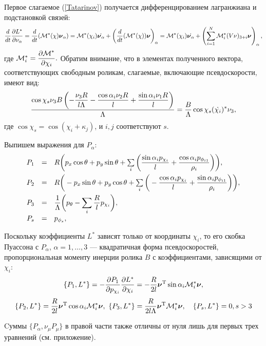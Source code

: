 Первое слагаемое (\ref{Tatarinov}) получается дифференцированием лагранжиана и подстановкой связей:
\begin{equation}
    \frac{d}{dt}\frac{\partial L^{*}}{\partial \nu_\alpha} = \frac{d}{dt}(\mathcal{M}^*(\chi)\boldsymbol{\mathbf{\nu}}_\alpha) = 
    \mathcal{M}^*(\chi_i)\dot{\boldsymbol{\mathbf{\nu}}_\alpha} +
    \left(\frac{d}{dt}(\mathcal{M}^*(\chi))\boldsymbol{\mathbf{\nu}}\right)_\alpha =
    \mathcal{M}^*(\chi_i)\dot{\boldsymbol{\mathbf{\nu}}_\alpha} +
    \left(\sum_{i=1}^{N}\mathcal{M}^*_i(V\nu)_{3+i}\boldsymbol{\mathbf{\nu}}\right)_\alpha,
\end{equation}
где $\mathcal{M}^*_i = \displaystyle\frac{\displaystyle \partial \mathcal{M}^*}{\displaystyle \partial \chi_i}.$ Обратим внимание, что в элементах полученного вектора, соответствующих свободным роликам, слагаемые, включающие псевдоскорости, имеют вид:
\begin{equation}
    \frac{\cos\chi_s \nu_3 B \left( -\displaystyle\frac{\displaystyle \nu_3 R}{\displaystyle l \Lambda}-\displaystyle\frac{\displaystyle \cos\alpha_i \nu_2 R}{\displaystyle l}+\displaystyle\frac{\displaystyle \sin\alpha_i \nu_1 R}{\displaystyle l}\right) }{\Lambda} = \frac{B}{\Lambda}\cos\chi_s(\dot{\chi_i})^*\nu_3,
\end{equation}
где $\cos\chi_s = \cos\left(\chi_i+\kappa_j\right)$, и $i,j$ соответствуют $s$.
 
Выпишем выражения для $P_\alpha$:
\begin{equation}\label{P}
    \begin{array}{rcl}
        P_1 & = & R\bigg(p_x\cos\theta + p_y\sin\theta + \sum\limits_{i}\bigg(\ddfrac{\sin\alpha_ip_{\chi_i}}{l} +  \ddfrac{\cos\alpha_ip_{\phi_{i1}}}{\rho_i}\bigg)\bigg),\vsp
        P_2 & = & R\bigg(-p_x\sin\theta + p_y\cos\theta + \sum\limits_{i}\bigg(-\ddfrac{\cos\alpha_ip_{\chi_i}}{l} +  \ddfrac{\sin\alpha_ip_{\phi_{i1}}}{\rho_i}\bigg)\bigg),\vsp
        P_3 & = & \ddfrac{1}{\Lambda}\bigg(p_\theta - \sum\limits_{i}\ddfrac{R}{l}p_{\chi_i}\bigg),\vsp
        P_s & = & p_{\phi_s},
    \end{array}
\end{equation}

Поскольку коэффициенты  $L^{*}$ зависят только от координаты $\chi_i$, то его скобка Пуассона с $P_\alpha$, $\alpha=1,\dots, 3$ --- квадратичная форма псевдоскоростей, пропорциональная моменту инерции ролика $B$ с коэффициентами, зависящими от $\chi_i$:
$$
\{P_1, L^*\} = -\frac{\partial P_1}{\partial p_{\chi_i}}\frac{\partial L^*}{\partial \chi_i} = -\frac{R}{2l}\boldsymbol{\mathbf{\nu}}^\mathrm{T}\sin\alpha_i\mathcal{M}^*_i\boldsymbol{\mathbf{\nu}},
$$
$$
\{P_2, L^*\} = \frac{R}{2l}\boldsymbol{\mathbf{\nu}}^\mathrm{T}\cos\alpha_i\mathcal{M}^*_i\boldsymbol{\mathbf{\nu}},\  
\{P_3, L^*\} = \frac{R}{2l\Lambda}\boldsymbol{\mathbf{\nu}}^\mathrm{T}\mathcal{M}^*_i\boldsymbol{\mathbf{\nu}},\quad \{P_s,L^*\} = 0, s>3
$$

Cуммы $\{P_\alpha, \nu_\mu P_\mu\}$ в правой части также отличны от нуля лишь для первых трех уравнений (см. приложение).

